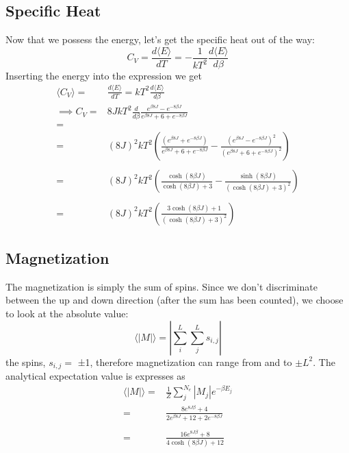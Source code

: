 \documentclass[%
oneside,                 %
final,                   %
10pt]{article}
\begin{document}
\subsection*{Specific Heat}
Now that we possess the energy, let's get the specific heat out of the way:
$$C_V = \frac{d \langle E \rangle}{dT} = -\frac{1}{kT^2} \frac{d \langle E \rangle}{d\beta}$$
Inserting the energy into the expression we get
\begin{equation}
\begin{split}
 \langle C_V \rangle =& \frac{d\langle E \rangle}{dT} = kT^2 \frac{d\langle E \rangle}{d\beta} \\
\implies C_V =& 8JkT^2 \frac{d}{d\beta}\frac{e^{\beta 8J} - e^{-8\beta J}}{e^{\beta 8J} + 6 + e^{-8\beta J}}\\
=& \\
 =& (8J)^2kT^2\left( \frac{(e^{\beta 8J} + e^{-8\beta J})}{e^{\beta 8J} + 6 + e^{-8\beta J}} - \frac{(e^{\beta 8J} - e^{-8\beta J})^2}{(e^{\beta 8J} + 6 + e^{-8\beta J})^2} \right)\\
 & \\ 
 =& (8J)^2kT^2\left(\frac{\cosh{(8\beta J)}}{\cosh{(8\beta J)} + 3 } - \frac{\sinh{(8\beta J)}}{(\cosh{(8\beta J)} + 3)^2} \right)\\
 & \\ 
 =& (8J)^2kT^2\left(\frac{3\cosh{(8\beta J) + 1}}{(\cosh{(8\beta J)} + 3)^2} \right)
 \end{split}
 \end{equation}
\subsection*{Magnetization}
 The magnetization is simply the sum of spins. Since we don't discriminate between the up and down direction (after the sum has been counted), we choose to look at the absolute value:
\begin{equation}
 \label{M}
 \langle |M| \rangle =\left|\sum_{i}^{L}\sum_{j}^{L} s_{i,j}\right|
\end{equation}
the spins, $s_{i,j} =$ ±1, therefore magnetization can range from and to $±L^2$.
The analytical expectation value is expresses as
\begin{equation}
\begin{split}
\langle |M| \rangle =& \frac{1}{Z} \sum_j^{N_e} |M_j| e^{-\beta E_j} \\
=& \frac{8e^{8J\beta} + 4}{2e^{\beta 8J} + 12 + 2e^{-8\beta J}} \\
&\\
=& \frac{16e^{8J\beta} + 8}{4\cosh{(8\beta J)} +  12 }
\end{split}
\end{equation}
\end{document}
